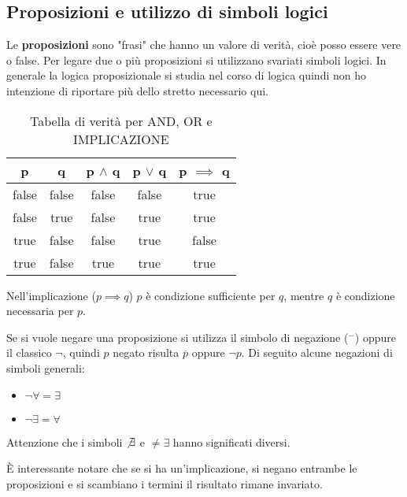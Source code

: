 \subsection{Proposizioni e utilizzo di simboli logici}

Le \textbf{proposizioni} sono "frasi" che hanno un valore di verità, cioè posso 
essere vere o false. Per legare due o più proposizioni si utilizzano svariati 
simboli logici. In generale la logica proposizionale si studia nel corso di 
logica quindi non ho intenzione di riportare più dello stretto necessario qui.

\begin{table}[H]
\centering
\begin{tabular}{|cc|c|c|c|}
    \hline
    p & q & \multicolumn{1}{l|}{p $\land$ q} & \multicolumn{1}{l|}{p $\lor$ q} 
        & \multicolumn{1}{l|}{p $\implies$ q} \\ \hline
    {\color[HTML]{000000} false} & {\color[HTML]{000000} false} & false & false 
        & true \\
    {\color[HTML]{000000} false} & {\color[HTML]{000000} true} & false & true 
        & true \\
    {\color[HTML]{000000} true} & {\color[HTML]{000000} false} & false & true 
        & false \\
    true & false & true & true & true \\ \hline
\end{tabular}

\caption{Tabella di verità per AND, OR e IMPLICAZIONE}
\end{table}

Nell'implicazione ($p \implies q$) $p$ è condizione sufficiente per $q$, mentre 
$q$ è condizione necessaria per $p$.

Se si vuole negare una proposizione si utilizza il simbolo di negazione ($^-$) 
oppure il classico $\neg$, quindi $p$ negato risulta $\overline{p}$ oppure 
$\neg p$. Di seguito alcune negazioni di simboli generali:
\begin{itemize}
    \item $\neg \forall = \exists$
    \item $\neg \exists = \forall$
\end{itemize}
Attenzione che i simboli $\not \exists$ e $\neq \exists$ hanno significati 
diversi. 

È interessante notare che se si ha un'implicazione, si negano entrambe le 
proposizioni e si scambiano i termini il risultato rimane invariato.

